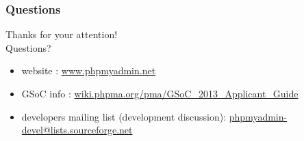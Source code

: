 \documentclass[14pt]{beamer}
\begin{document}
  \begin{frame}
   \frametitle{Questions}
    Thanks for your attention!\\
    Questions?
    \begin{itemize}
      \item website : \href{http://www.phpmyadmin.net/}{www.phpmyadmin.net}
      \item GSoC info : \href{http://wiki.phpma.org/pma/GSoC\_2013\_Applicant\_Guide}{wiki.phpma.org/pma/GSoC\_2013\_Applicant\_Guide}
      \item developers mailing list (development discussion): \href{mailto:phpmyadmin-devel@lists.sourceforge.net}{phpmyadmin-devel@lists.sourceforge.net}
    \end{itemize}
  \end{frame}
\end{document}
